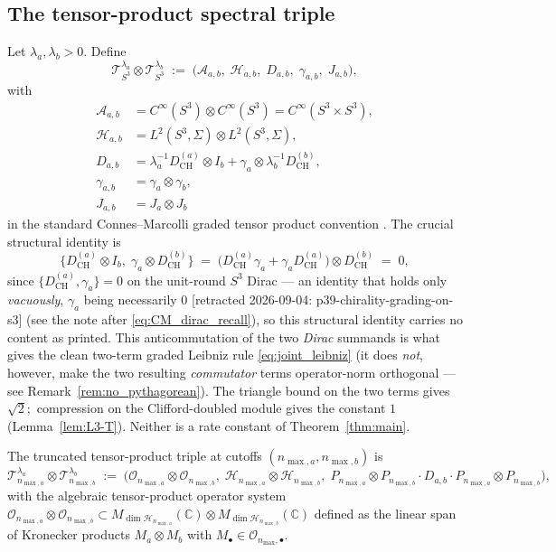\documentclass[11pt,a4paper]{article}
\theoremstyle{plain}
\theoremstyle{definition}
\newcommand{\nmax}{n_{\max}}
\newcommand{\nmaxa}{n_{\max,a}}
\newcommand{\nmaxb}{n_{\max,b}}
\newcommand{\sthree}{S^{3}}
\newcommand{\Hilb}{\mathcal{H}}
\newcommand{\Op}{\mathcal{O}}
\newcommand{\Tcal}{\mathcal{T}}
\newcommand{\Acal}{\mathcal{A}}
\newcommand{\C}{\mathbb{C}}
\newcommand{\Mat}{M}
\newcommand{\DCH}{D_{\mathrm{CH}}}
\begin{document}
\subsection{The tensor-product spectral triple}
\label{sec:tensor_triple}

Let $\lambda_a, \lambda_b > 0$. Define
\begin{equation}\label{eq:tensor_triple_def}
\Tcal_{\sthree}^{\lambda_a} \otimes \Tcal_{\sthree}^{\lambda_b}
\;:=\; \bigl(\Acal_{a,b},\; \Hilb_{a,b},\; D_{a,b},\; \gamma_{a,b},\;
J_{a,b}\bigr),
\end{equation}
with
\begin{align}
\Acal_{a,b} &= C^\infty(\sthree) \otimes C^\infty(\sthree) =
C^\infty(\sthree \times \sthree), \\
\Hilb_{a,b} &= L^2(\sthree, \Sigma) \otimes L^2(\sthree, \Sigma), \\
D_{a,b} &= \lambda_a^{-1} \DCH^{(a)} \otimes I_b
        + \gamma_a \otimes \lambda_b^{-1} \DCH^{(b)}, \label{eq:CM_dirac_recall} \\
\gamma_{a,b} &= \gamma_a \otimes \gamma_b, \\
J_{a,b} &= J_a \otimes J_b
\end{align}
in the standard Connes--Marcolli graded tensor product convention
\cite{connes1995, marcolli_vs2014}. The crucial structural identity is
\begin{equation}\label{eq:anticomm}
   \bigl\{ \DCH^{(a)} \otimes I_b,\; \gamma_a \otimes \DCH^{(b)} \bigr\}
   \;=\; \bigl(\DCH^{(a)} \gamma_a + \gamma_a \DCH^{(a)}\bigr) \otimes
         \DCH^{(b)} \;=\; 0,
\end{equation}
since $\{\DCH^{(a)}, \gamma_a\} = 0$ on the unit-round $\sthree$ Dirac
--- an identity that holds only \emph{vacuously}, $\gamma_a$ being
necessarily $0$ [retracted 2026-09-04: p39-chirality-grading-on-s3] (see the note after
\eqref{eq:CM_dirac_recall}), so this structural identity carries no content
as printed.
This anticommutation of the two \emph{Dirac} summands is what gives the
clean two-term graded Leibniz rule \eqref{eq:joint_leibniz} (it does
\emph{not}, however, make the two resulting \emph{commutator} terms
operator-norm orthogonal --- see Remark~\ref{rem:no_pythagorean}). The
triangle bound on the two terms gives $\sqrt 2$;\ compression on the
Clifford-doubled module gives the constant $1$ (Lemma~\ref{lem:L3-T}).
Neither is a rate constant of Theorem~\ref{thm:main}.

The truncated tensor-product triple at cutoffs $(\nmaxa, \nmaxb)$ is
\begin{equation}\label{eq:tensor_truncated}
\Tcal_{\nmaxa}^{\lambda_a} \otimes \Tcal_{\nmaxb}^{\lambda_b}
\;:=\; \bigl(\Op_{\nmaxa} \otimes \Op_{\nmaxb},\;
\Hilb_{\nmaxa} \otimes \Hilb_{\nmaxb},\;
P_{\nmaxa} \otimes P_{\nmaxb} \cdot D_{a,b} \cdot P_{\nmaxa} \otimes
P_{\nmaxb}\bigr),
\end{equation}
with the algebraic tensor-product operator system $\Op_{\nmaxa} \otimes
\Op_{\nmaxb} \subset M_{\dim \Hilb_{\nmaxa}} (\C) \otimes
M_{\dim \Hilb_{\nmaxb}}(\C)$ defined as the linear span of Kronecker
products $\Mat_a \otimes \Mat_b$ with $\Mat_\bullet \in \Op_{\nmax,
\bullet}$.
\end{document}
